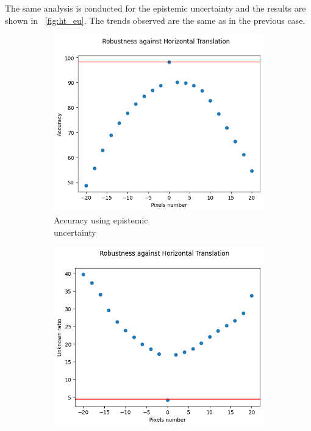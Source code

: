 The same analysis is conducted for the epistemic uncertainty and the results are shown in \Fig~\ref{fig:ht_eu}. The trends observed are the same as in the previous case.

\begin{figure}[h]
	\centering
	\begin{subfigure}{.33\textwidth}
		\centering
		\includegraphics[width=0.9\linewidth]{ImageFiles/EvalBNN/HT/EU/acc}
		\caption{Accuracy using epistemic \\ uncertainty}
		\label{fig:ht_eu_acc}
	\end{subfigure}%
	\begin{subfigure}{.33\textwidth}
		\centering
		\includegraphics[width=0.9\linewidth]{ImageFiles/EvalBNN/HT/EU/unkn}

\end{subfigure}
\end{figure}
